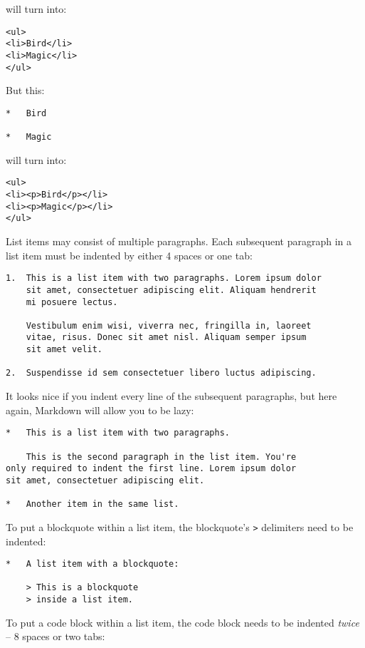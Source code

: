 will turn into:

\begin{verbatim}
<ul>
<li>Bird</li>
<li>Magic</li>
</ul>
\end{verbatim}

But this:

\begin{verbatim}
*   Bird

*   Magic
\end{verbatim}

will turn into:

\begin{verbatim}
<ul>
<li><p>Bird</p></li>
<li><p>Magic</p></li>
</ul>
\end{verbatim}

List items may consist of multiple paragraphs. Each subsequent
paragraph in a list item must be indented by either 4 spaces
or one tab:

\begin{verbatim}
1.  This is a list item with two paragraphs. Lorem ipsum dolor
    sit amet, consectetuer adipiscing elit. Aliquam hendrerit
    mi posuere lectus.

    Vestibulum enim wisi, viverra nec, fringilla in, laoreet
    vitae, risus. Donec sit amet nisl. Aliquam semper ipsum
    sit amet velit.

2.  Suspendisse id sem consectetuer libero luctus adipiscing.
\end{verbatim}

It looks nice if you indent every line of the subsequent
paragraphs, but here again, Markdown will allow you to be
lazy:

\begin{verbatim}
*   This is a list item with two paragraphs.

    This is the second paragraph in the list item. You're
only required to indent the first line. Lorem ipsum dolor
sit amet, consectetuer adipiscing elit.

*   Another item in the same list.
\end{verbatim}

To put a blockquote within a list item, the blockquote's \texttt{>}
delimiters need to be indented:

\begin{verbatim}
*   A list item with a blockquote:

    > This is a blockquote
    > inside a list item.
\end{verbatim}

To put a code block within a list item, the code block needs
to be indented \emph{twice} -- 8 spaces or two tabs:

